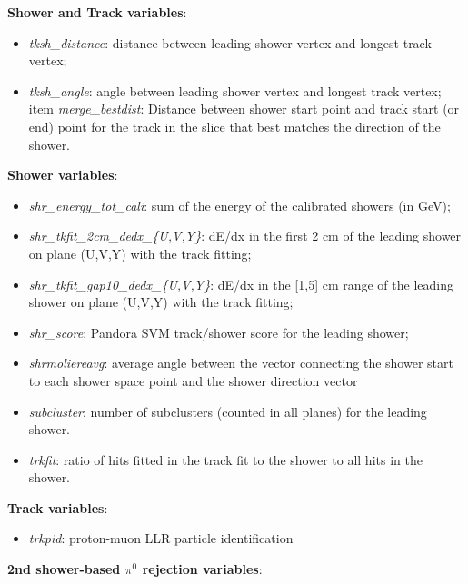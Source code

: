 \documentclass[a4paper]{article}
\begin{document}
\par \noindent \textbf{Shower and Track variables}:

\begin{itemize}
    \item \emph{tksh\_distance}: distance between leading shower vertex and longest track vertex;
    \item \emph{tksh\_angle}: angle between leading shower vertex and longest track vertex;
    item \emph{merge\_bestdist}: Distance between shower start point and track start (or end) point for the track in the slice that best matches the direction of the shower. 
\end{itemize}

\par \noindent \textbf{Shower variables}:

\begin{itemize}
    \item \emph{shr\_energy\_tot\_cali}: sum of the energy of the calibrated showers (in GeV);
    \item \emph{shr\_tkfit\_2cm\_dedx\_\{U,V,Y\}}: dE/dx in the first 2 cm of the leading shower on plane (U,V,Y) with the track fitting;
    \item \emph{shr\_tkfit\_gap10\_dedx\_\{U,V,Y\}}: dE/dx in the [1,5] cm range of the leading shower on plane (U,V,Y) with the track fitting;
    \item \emph{shr\_score}: Pandora SVM track/shower score for the leading shower;
    \item \emph{shrmoliereavg}: average angle between the vector connecting the shower start to each shower space point and the shower direction vector
    \item \emph{subcluster}: number of subclusters (counted in all planes) for the leading shower.
    \item \emph{trkfit}: ratio of hits fitted in the track fit to the shower to all hits in the shower.
\end{itemize}

\par \noindent  \textbf{Track variables}:

\begin{itemize}
    \item \emph{trkpid}: proton-muon LLR particle identification 
\end{itemize}

\par \noindent  \textbf{2nd shower-based $\pi^0$ rejection variables}:
\end{document}
